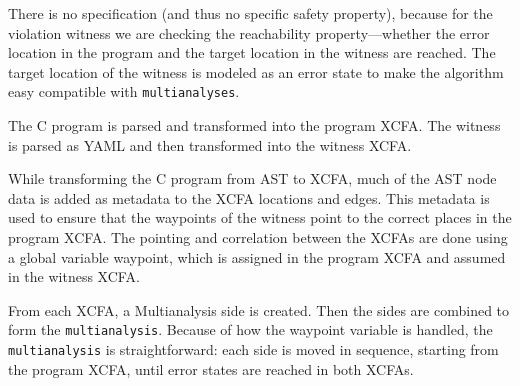 %     
%         
%     
%     


There is no specification (and thus no specific safety property), because for the 
violation witness we are checking the reachability property—whether the error location
in the program and the target location in the witness are reached. The target location
of the witness is modeled as an error state to make the algorithm easy compatible with \texttt{multianalyses}.

The C program is parsed and transformed into the program XCFA. The witness is parsed as YAML and 
then transformed into the witness XCFA.

While transforming the C program from AST to XCFA, much of the AST node data is added as metadata 
to the XCFA locations and edges. This metadata is used to ensure that the waypoints of the witness 
point to the correct places in the program XCFA. The pointing and correlation between the XCFAs are 
done using a global variable waypoint, which is assigned in the program XCFA and assumed in the 
witness XCFA.

From each XCFA, a Multianalysis side is created. Then the sides are combined to form the \texttt{multianalysis}. 
Because of how the waypoint variable is handled, the \texttt{multianalysis} is straightforward: each side 
is moved in sequence, starting from the program XCFA, until error states are reached in both XCFAs.


